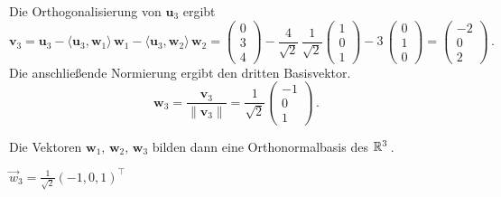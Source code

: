 {Die Orthogonalisierung von $\boldsymbol u_3$ ergibt
\begin{equation*}
\boldsymbol v_3
= \boldsymbol u_3
- \langle \boldsymbol u_3, \boldsymbol w_1\rangle\, \boldsymbol w_1
- \langle \boldsymbol u_3, \boldsymbol w_2\rangle\, \boldsymbol w_2
% 
= \begin{pmatrix}0 \\ 3 \\ 4\end{pmatrix}
- \dfrac{4}{\sqrt{2}}\, \dfrac{1}{\sqrt{2}} \begin{pmatrix}1 \\ 0 \\ 1\end{pmatrix}
- 3\, \begin{pmatrix}0 \\ 1 \\ 0 \end{pmatrix}
% 
= \begin{pmatrix}-2 \\ 0 \\ 2\end{pmatrix}\,.
\end{equation*}
% 
Die anschließende Normierung ergibt den dritten Basisvektor.
\begin{equation*}
\boldsymbol w_3
= \dfrac{\boldsymbol v_3}{\|\boldsymbol v_3\|}
= \dfrac{1}{\sqrt{2}} \begin{pmatrix} -1 \\ 0 \\ 1\end{pmatrix}\,.
\end{equation*}

Die Vektoren $ \boldsymbol w_1,\, \boldsymbol w_2,\, \boldsymbol w_3$ bilden dann eine Orthonormalbasis des $\mathbb{R}^3$\,.
}

{
$\vec w_3= \frac 1{\sqrt 2} (-1,0,1)^\top$
}
